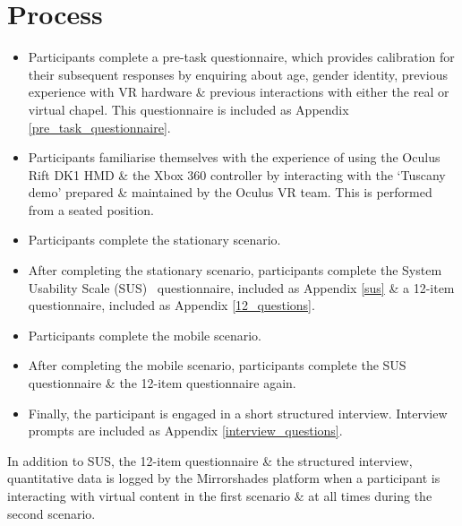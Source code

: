 \documentclass[oneside]{book}
\begin{document}
\section{Process}
\begin{itemize}
	\item Participants complete a pre-task questionnaire, which provides calibration for their subsequent responses by enquiring about age, gender identity, previous experience with VR hardware \& previous interactions with either the real or virtual chapel. This questionnaire is included as Appendix \ref{pre_task_questionnaire}.
	
	\item Participants familiarise themselves with the experience of using the Oculus Rift DK1 HMD \& the Xbox 360 controller by interacting with the `Tuscany demo' prepared \& maintained by the Oculus VR team. This is performed from a seated position.
	
	\item Participants complete the stationary scenario.
	
	\item After completing the stationary scenario, participants complete the System Usability Scale (SUS)~\cite{Brooke1996} questionnaire, included as Appendix \ref{sus} \& a 12-item questionnaire, included as Appendix \ref{12_questions}.
	
	\item Participants complete the mobile scenario.
	
	\item After completing the mobile scenario, participants complete the SUS questionnaire \& the 12-item questionnaire again.
	
	\item Finally, the participant is engaged in a short structured interview. Interview prompts are included as Appendix \ref{interview_questions}.
\end{itemize}

In addition to SUS, the 12-item questionnaire \& the structured interview, quantitative data is logged by the Mirrorshades platform when a participant is interacting with virtual content in the first scenario \& at all times during the second scenario.
\end{document}
